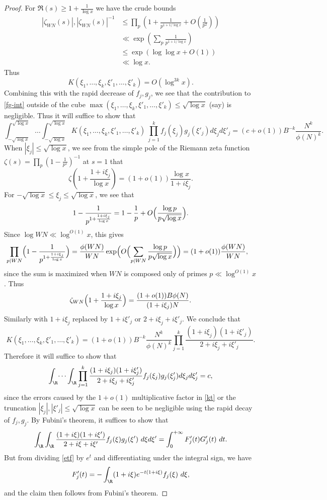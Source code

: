 \begin{proof}
For $\Re(s) \geq 1 + \frac{1}{\log x}$ we have the crude bounds
\begin{align*}
 |\zeta_{W N}(s)|, |\zeta_{W N}(s)|^{-1} &\leq \prod_p \left(1 + \frac{1}{p^{1+1/\log x}} + O\left(\frac{1}{p^2}\right)\right)\\
&\ll \exp\left( \sum_p \frac{1}{p^{1+1/\log x}} \right) \\
&\leq \exp( \log\log x + O(1) ) \\
&\ll \log x.
\end{align*}
Thus
$$
 K(\xi_1,\dots,\xi_k,\xi'_1,\dots,\xi'_k) = O( \log^{3k} x ).$$
Combining this with the rapid decrease of $f_j, g_j$, we see that the contribution to \eqref{fg-int} outside of the cube $\max(\xi_1,\dots,\xi_k,\xi'_1,\dots,\xi'_k) \leq \sqrt{\log x}$ (say) is negligible.  Thus it will suffice to show that
$$
 \int_{-\sqrt{\log x}}^{\sqrt{\log x}} \dots \int_{-\sqrt{\log x}}^{\sqrt{\log x}} K(\xi_1,\dots,\xi_k,\xi'_1,\dots,\xi'_k)\ \prod_{j=1}^k f_j(\xi_j) g_j(\xi'_j) d\xi_j d\xi'_j = (c+o(1)) B^{-k}\frac{N^k}{\phi(N)^k}.
$$
When $|\xi_j| \leq \sqrt{\log x}$, we see from the simple pole of the Riemann zeta function $\zeta(s) = \prod_p (1-\frac{1}{p^s})^{-1}$ at $s=1$ that
$$ \zeta\left(1 + \frac{1+i\xi_j}{\log x}\right) = (1+o(1)) \frac{\log x}{1+i\xi_j}.$$
For $-\sqrt{\log{x}}\le \xi_j\le \sqrt{\log{x}}$, we see that
$$ 1-\frac{1}{p^{1+\frac{1+i\xi_j}{\log{x}}}}=1-\frac{1}{p}+O\Bigl(\frac{\log{p}}{p\sqrt{\log{x}}}\Bigr).$$
Since $\log{WN}\ll \log^{O(1)}{x}$, this gives
\begin{align*}
 \prod_{p|WN} \Bigl(1 - \frac{1}{p^{1+\frac{1+i\xi_j}{\log x}}}\Bigr) &= \frac{\phi(WN)}{WN}\exp\Bigl(O\Bigl(\sum_{p|WN}\frac{\log{p}}{p\sqrt{\log{x}}}\Bigr)\Bigr) = (1+o(1))\frac{\phi(WN)}{WN},
\end{align*}
since the sum is maximized when $WN$ is composed only of primes $p\ll \log^{O(1)}{x}$. Thus
$$ \zeta_{WN}\Bigl(1 + \frac{1+i\xi_j}{\log x}\Bigr) = \frac{(1+o(1)) B \phi(N)}{(1 + i\xi_j)N}.$$
Similarly with $1+i\xi_j$ replaced by $1+i\xi'_j$ or $2+i\xi_j+i\xi'_j$.  We conclude that
\begin{equation}\label{kt}
 K(\xi_1,\dots,\xi_k,\xi'_1,\dots,\xi'_k) = (1+o(1)) B^{-k}\frac{N^k}{\phi(N)^k} \prod_{j=1}^k \frac{(1+i\xi_j) (1+i\xi'_j)}{2+i\xi_j+i\xi'_j}.
\end{equation}
Therefore it will suffice to show that
$$
 \int_\R \dots \int_\R \prod_{j=1}^k \frac{(1+i\xi_j) (1+i\xi'_j)}{2+i\xi_j+i\xi'_j}  f_j(\xi_j) g_j(\xi'_j) d\xi_j d\xi'_j
= c,$$
since the errors caused by the $1+o(1)$ multiplicative factor in \eqref{kt} or the truncation $|\xi_j|, |\xi'_j| \leq \sqrt{\log x}$ can be seen to be negligible using the rapid decay of $f_j,g_j$.  By Fubini's theorem, it suffices to show that
$$ 
\int_\R \int_\R \frac{(1+i\xi) (1+i\xi')}{2+i\xi+i\xi'} f_j(\xi) g_j(\xi')\ d\xi d\xi' = \int_0^{+\infty} F_j'(t) G_j'(t)\ dt.$$
But from dividing \eqref{etf} by $e^t$ and differentiating under the integral sign, we have
$$F'_j(t) = - \int_\R (1+i\xi) e^{-t(1+i\xi)} f_j(\xi)\ d\xi,$$
and the claim then follows from Fubini's theorem.


\end{proof}
